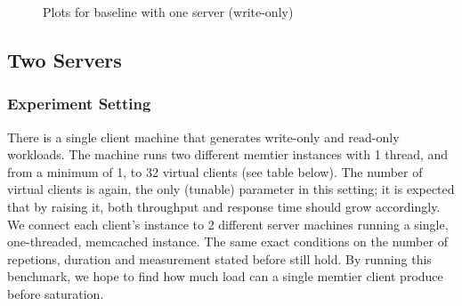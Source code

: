 \documentclass[11pt,a4paper]{article}
\begin{document}
\begin{figure}[!h]
  \centering
  \caption{Plots for baseline with one server (write-only)}
  \label{fig:baseline_no_mw_1_server_wo}
\end{figure}

\subsection{Two Servers}
\label{sec:2.2}

\subsubsection{Experiment Setting}

There is a single client machine that generates write-only and read-only workloads. The machine runs two different memtier instances with 1 thread, and from a minimum of 1, to 32 virtual clients (see table below).
The number of virtual clients is again, the only (tunable) parameter in this setting; it is expected that by raising it, both throughput and response time should grow accordingly. We connect each client's instance to 2 different server machines running a single, one-threaded, memcached instance. The same exact conditions on the number of repetions, duration and measurement stated before still hold. By running this benchmark, we hope to find how much load can a single memtier client produce before saturation.
\end{document}
